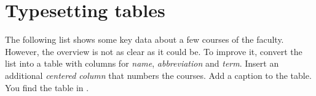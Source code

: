 \section{Typesetting tables}

The following list shows some key data about a few courses of the  faculty.
However, the overview is not as clear as it could be.
To improve it, convert the list into a table with columns for \emph{name}, \emph{abbreviation} and \emph{term}.
Insert an additional \emph{centered column} that numbers the courses. 
Add a caption to the table.
You find the table in .



